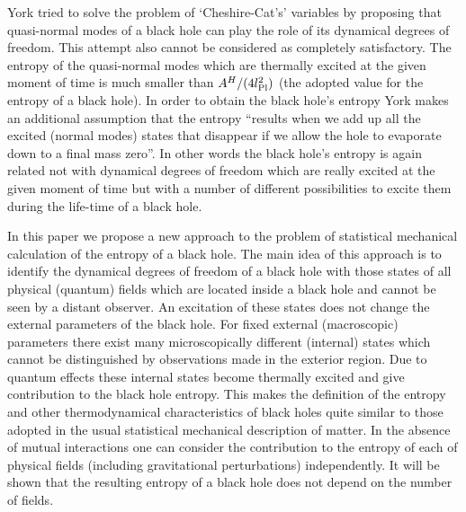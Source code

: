 \documentclass[superscriptaddress,showpacs,preprintnumbers,amsmath,amssymb,
nofootinbib,twocolumn,aps,prd,10pt]{revtex4-1}
\begin{document}
York \cite{York:83} tried to  solve the problem of  `Cheshire-Cat's'
variables by proposing that  quasi-normal modes of a black  hole
can play the role  of its dynamical degrees  of freedom. This attempt
also cannot be considered  as completely satisfactory.  The entropy of
the quasi-normal modes which are thermally excited at the given moment
of time is much  smaller than  $A^H/(4l_{\mbox{\scriptsize{Pl}}}^2)$ (the
adopted
value for the  entropy of a  black hole). In  order
to obtain  the   black  hole's    entropy  York \cite{York:83}  makes  an
additional assumption that the entropy ``results  when we  add up  all
the excited (normal modes) states that  disappear if   we allow the
hole  to  evaporate down to  a final mass  zero''. In other words the
black  hole's entropy is  again  related  not  with  dynamical  degrees
of freedom which are really  excited  at  the  given  moment  of  time
but with a number of different possibilities to excite them during the
life-time of a black hole.

In this paper we propose a new approach to the problem of  statistical
mechanical calculation of the entropy  of a black hole. The  main idea
of this approach is to identify the dynamical degrees of freedom of  a
black  hole  with  those  states  of all physical (quantum) fields which
are located  inside   a black   hole   and   cannot   be   seen  by  a
distant observer.   An   excitation    of   these   states   does  not
change   the    external parameters  of the    black  hole. For  fixed
external    (macroscopic)  parameters      there      exist       many
microscopically      different   (internal)     states           which
cannot       be   distinguished    by observations made in the
exterior region.   Due  to  quantum
effects  these   internal  states become  thermally excited  and  give
contribution to  the black hole  entropy.  This makes  the  definition
of the   entropy and   other thermodynamical characteristics  of black
holes quite similar to those adopted in
the usual  statistical  mechanical description
of matter. In the absence of mutual interactions one can consider  the
contribution  to  the  entropy  of  each of physical fields (including
gravitational  perturbations)  independently.  It  will be shown that
the  resulting   entropy of  a black  hole does  not depend on the
number of fields.
\end{document}
